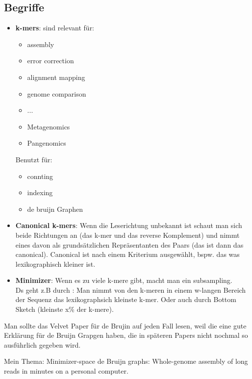 \documentclass[main.tex]{subfiles}
\begin{document}
\subsection{Begriffe}
\begin{itemize}
    \item \textbf{\glspl{k-mer}}: sind relevant für:
\begin{itemize}
    \item assembly
    \item error correction
    \item alignment mapping
    \item genome comparison 
    \item ...
    \item \gls{Metagenomics}
    \item \gls{Pangenomics}
\end{itemize}
    Benutzt für: 
\begin{itemize}
    \item connting
    \item indexing
    \item de bruijn Graphen 
\end{itemize}
\item \textbf{Canonical k-mers}: Wenn die Leserichtung unbekannt ist schaut man sich beide Richtungen an (das k-mer und das reverse Komplement) und nimmt eines davon als grundsätzlichen Repräsentanten des Paars (das ist dann das canonical). Canonical ist nach einem Kriterium ausgewählt, bspw. das was lexikographisch kleiner ist. 
\item \textbf{Minimizer}: Wenn es zu viele k-mere gibt, macht man ein subsampling. \\
Ds geht z.B durch : Man nimmt von den k-meren in einem w-langen Bereich der Sequenz das lexikographsich kleinste k-mer. Oder auch durch Bottom Sketch (kleinste x\% der k-mere).
\end{itemize}  
\begin{tipp}[title=Tipp]
Man sollte das Velvet Paper für de Brujin auf jeden Fall lesen, weil die eine gute Erklärung für de Bruijn Grapgen haben, die in späteren Papers nicht nochmal so ausführlich gegeben wird.
\end{tipp}
Mein Thema: Minimizer-space de Bruijn graphs: Whole-genome assembly of long reads in minutes on a personal computer. \\





 
\end{document}
